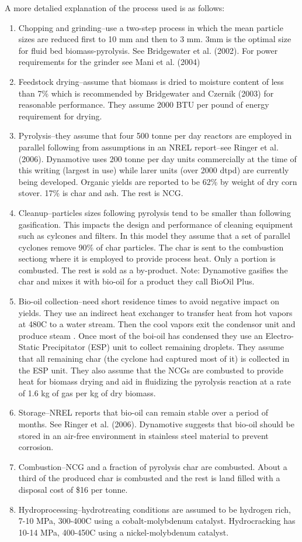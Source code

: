 \documentclass{article}\usepackage[]{graphicx}\usepackage[]{color}
\begin{document}
A more detalied explanation of the process used is as follows:
\begin{enumerate}
\item Chopping and grinding--use a two-step process in which the mean particle sizes are reduced first to 10 mm and then to 3 mm.  3mm is the optimal size for fluid bed biomass-pyrolysis.  See Bridgewater et al. (2002).  For power requirements for the grinder see Mani et al. (2004)
\item Feedstock drying--assume that biomass is dried to moisture content of less than 7\% which is recommended by Bridgewater and Czernik (2003) for reasonable performance.  They assume 2000 BTU per pound of energy requirement for drying.
\item Pyrolysis--they assume that four 500 tonne per day reactors are employed in parallel following from assumptions in an NREL report--see Ringer et al. (2006).  Dynamotive uses 200 tonne per day units commercially at the time of this writing (largest in use) while larer units (over 2000 dtpd) are currently being developed.  Organic yields are reported to be 62\% by weight of dry corn stover.  17\% is char and ash.  The rest is NCG.
\item Cleanup--particles sizes following pyrolysis tend to be smaller than following gasification.  This impacts the design and performance of cleaning equipment such as cylcones and filters.  In this model they assume that a set of parallel cyclones remove 90\% of char particles.  The char is sent to the combustion sectiong where it is employed to provide process heat.  Only a portion is combusted.  The rest is sold as a by-product.  Note: Dynamotive gasifies the char and mixes it with bio-oil for a product they call BioOil Plus.
\item Bio-oil collection--need short residence times to avoid negative impact on yields.  They use an indirect heat exchanger to transfer heat from hot vapors at 480\degree C to a water stream.  Then the cool vapors exit the condensor unit and produce steam .  Once most of the boi-oil has condensed they use an Electro-Static Precipitator (ESP) unit to collect remaining droplets.  They assume that all remaining char (the cyclone had captured most of it) is collected in the ESP unit.  They also assume that the NCGs are combusted to provide heat for biomass drying and aid in fluidizing the pyrolysis reaction at a rate of 1.6 kg of gas per kg of dry biomass.
\item Storage--NREL reports that bio-oil can remain stable over a period of months.  See Ringer et al. (2006).  Dynamotive suggests that bio-oil should be stored in an air-free environment in stainless steel material to prevent corrosion.
\item Combustion--NCG and a fraction of pyrolysis char are combusted.  About a third of the produced char is combusted and the rest is land filled with a disposal cost of \$16 per tonne.
\item Hydroprocessing--hydrotreating conditions are assumed to be hydrogen rich, 7-10 MPa, 300-400\degree C using a cobalt-molybdenum catalyst.  Hydrocracking has 10-14 MPa, 400-450\degree C using a nickel-molybdenum catalyst.
\end{enumerate}
\end{document}
